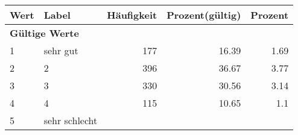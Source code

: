      \begin{longtable}{lXrrr}
     \toprule
     \textbf{Wert} & \textbf{Label} & \textbf{Häufigkeit} & \textbf{Prozent(gültig)} & \textbf{Prozent} \\
     \endhead
     \midrule
     \multicolumn{5}{l}{\textbf{Gültige Werte}}\\

     1 &
     \multicolumn{1}{X}{ sehr gut   } &


       \num{177} &
       \num[round-mode=places,round-precision=2]{16,39} &
         \num[round-mode=places,round-precision=2]{1,69} \\

     2 &
     \multicolumn{1}{X}{ 2   } &


       \num{396} &
       \num[round-mode=places,round-precision=2]{36,67} &
         \num[round-mode=places,round-precision=2]{3,77} \\

     3 &
     \multicolumn{1}{X}{ 3   } &


       \num{330} &
       \num[round-mode=places,round-precision=2]{30,56} &
         \num[round-mode=places,round-precision=2]{3,14} \\

     4 &
     \multicolumn{1}{X}{ 4   } &


       \num{115} &
       \num[round-mode=places,round-precision=2]{10,65} &
         \num[round-mode=places,round-precision=2]{1,1} \\

     5 &
     \multicolumn{1}{X}{ sehr schlecht   } &



\end{longtable}

